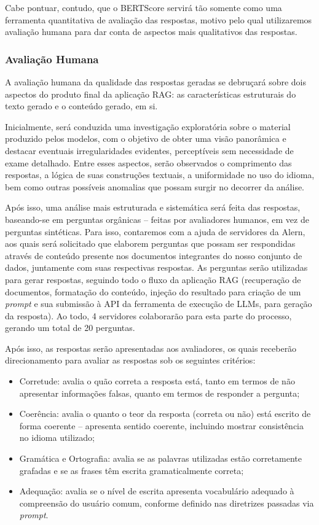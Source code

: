 Cabe pontuar, contudo, que o BERTScore servirá tão somente como uma ferramenta quantitativa de avaliação das respostas, motivo pelo qual utilizaremos avaliação humana para dar conta de aspectos mais qualitativos das respostas.

\subsubsection{Avaliação Humana}
\label{subsubsec:Metodologia.6.3.2}
A avaliação humana da qualidade das respostas geradas se debruçará sobre dois aspectos do produto final da aplicação \ac{RAG}: as características estruturais do texto gerado e o conteúdo gerado, em si.

Inicialmente, será conduzida uma investigação exploratória sobre o material produzido pelos modelos, com o objetivo de obter uma visão panorâmica e destacar eventuais irregularidades evidentes, perceptíveis sem necessidade de exame detalhado. Entre esses aspectos, serão observados o comprimento das respostas, a lógica de suas construções textuais, a uniformidade no uso do idioma, bem como outras possíveis anomalias que possam surgir no decorrer da análise.

Após isso, uma análise mais estruturada e sistemática será feita das respostas, baseando-se em perguntas orgânicas -- feitas por avaliadores humanos, em vez de perguntas sintéticas. Para isso, contaremos com a ajuda de servidores da \ac{Alern}, aos quais será solicitado que elaborem perguntas que possam ser respondidas através de conteúdo presente nos documentos integrantes do nosso conjunto de dados, juntamente com suas respectivas respostas. As perguntas serão utilizadas para gerar respostas, seguindo todo o fluxo da aplicação \ac{RAG} (recuperação de documentos, formatação do conteúdo, injeção do resultado para criação de um \textit{prompt} e sua submissão à API da ferramenta de execução de \ac{LLM}s, para geração da resposta). Ao todo, 4 servidores colaborarão para esta parte do processo, gerando um total de 20 perguntas.

Após isso, as respostas serão apresentadas aos avaliadores, os quais receberão direcionamento para avaliar as respostas sob os seguintes critérios:

\begin{itemize}
    \item Corretude: avalia o quão correta a resposta está, tanto em termos de não apresentar informações falsas, quanto em termos de responder a pergunta;
    \item Coerência: avalia o quanto o teor da resposta (correta ou não) está escrito de forma coerente -- apresenta sentido coerente, incluindo mostrar consistência no idioma utilizado;
    \item Gramática e Ortografia: avalia se as palavras utilizadas estão corretamente grafadas e se as frases têm escrita gramaticalmente correta;
    \item Adequação: avalia se o nível de escrita apresenta vocabulário adequado à compreensão do usuário comum, conforme definido nas diretrizes passadas via \textit{prompt}.
\end{itemize}

